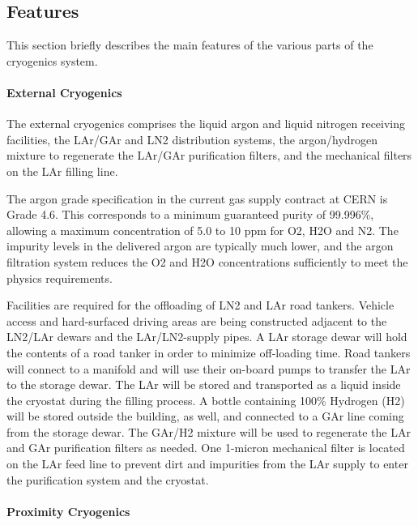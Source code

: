 \subsection{Features}

This section briefly describes the main features of the various parts of the cryogenics system.

\paragraph{External Cryogenics}

The external cryogenics comprises the liquid argon and liquid nitrogen receiving facilities, the LAr/GAr and LN2 distribution systems, the argon/hydrogen mixture to regenerate the LAr/GAr purification filters, and the mechanical filters on the LAr filling line.

The argon grade specification in the current gas supply contract at CERN is Grade 4.6. This corresponds to
 a minimum guaranteed purity of 99.996\%, allowing a maximum concentration of 5.0  to 10 ppm for O2, H2O and N2.  
The impurity levels in the delivered argon are typically much lower, and the argon filtration system reduces the O2 and H2O concentrations sufficiently to meet the physics requirements. 

Facilities are required for the offloading of LN2 and LAr road tankers. Vehicle access and hard-surfaced driving areas are being constructed adjacent to the LN2/LAr dewars and the LAr/LN2-supply pipes. A LAr storage dewar will hold the contents of a road tanker in order to minimize off-loading time. Road tankers will connect to a manifold and will use their on-board pumps to transfer the LAr to the storage dewar.  The LAr will be stored and transported as a liquid inside the cryostat during the filling process. 
A bottle containing 100\% Hydrogen (H2) will be stored outside the building, as well, and connected to a GAr line coming from the storage dewar. The GAr/H2 mixture  will be used to regenerate the LAr and GAr purification filters as needed.
%
One 1-micron mechanical filter is located on the LAr feed line to prevent dirt and impurities from the LAr supply to enter the purification system and the cryostat.

\paragraph{Proximity Cryogenics}

